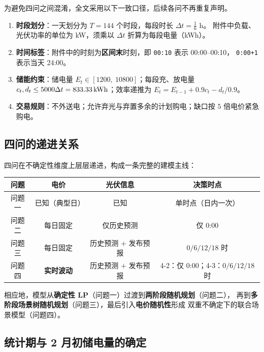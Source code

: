 为避免四问之间混淆，全文采用以下一致口径，后续各问不再重复声明。

\begin{enumerate}[itemsep=2pt,topsep=3pt]
  \item \textbf{时段划分}：一天划分为 $T=144$ 个时段，每段时长 $\Delta t=\tfrac{1}{6}$ h。
        附件中负载、光伏功率的单位为 kW，须乘以 $\Delta t$ 折算为每段电量（kWh）。
  \item \textbf{时间标签}：附件中的时刻为\textbf{区间末}时刻，即 \texttt{00:10} 表示 00:00--00:10，
        \texttt{0:00+1} 表示当天 24:00。
  \item \textbf{储能约束}：储电量 $E_t\in[1200,\ 10800]$；每段充、放电量
        $c_t,d_t\le 5000\Delta t=833.33\,\text{kWh}$；效率递推为
        $E_t=E_{t-1}+0.9c_t-d_t/0.9$。
  \item \textbf{交易规则}：不外送电；允许弃光与弃置多余的计划购电；缺口按 $5$ 倍电价紧急购电。
\end{enumerate}

\subsection{四问的递进关系}

四问在不确定性维度上层层递进，构成一条完整的建模主线：

\begin{center}
\begin{tabular}{@{}c c c c@{}}
\toprule
问题 & 电价 & 光伏信息 & 决策时点 \\
\midrule
问题一 & 已知（典型日）   & 已知              & 单时点（日内一次）\\
问题二 & 每日固定         & 仅历史预测        & 仅 $0$:00 \\
问题三 & 每日固定         & 历史预测 $+$ 发布预报 & $0/6/12/18$ 时 \\
问题四 & \textbf{实时波动} & 历史预测 $+$ 发布预报 & 4-2：仅 $0$:00；4-3：$0/6/12/18$ 时 \\
\bottomrule
\end{tabular}
\end{center}

相应地，模型从\textbf{确定性 LP}（问题一）过渡到\textbf{两阶段随机规划}（问题二），
再到\textbf{多阶段场景树随机规划}（问题三），最后引入\textbf{电价随机性}形成
双重不确定下的联合场景模型（问题四）。

\subsection{统计期与 2 月初储电量的确定}
\label{sec:init}

